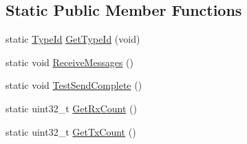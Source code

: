 \subsection*{Static Public Member Functions}
\begin{DoxyCompactItemize}
\item 
static \hyperlink{classns3_1_1TypeId}{Type\+Id} \hyperlink{classns3_1_1GrantedTimeWindowMpiInterface_a40efec8b7d4cc9a4849866ce100b141b}{Get\+Type\+Id} (void)
\item 
static void \hyperlink{classns3_1_1GrantedTimeWindowMpiInterface_a25a6699dcab1ab2e348e0b5a2c90aa42}{Receive\+Messages} ()
\item 
static void \hyperlink{classns3_1_1GrantedTimeWindowMpiInterface_a517789eabe6a386e850cffb7e4d1a0dc}{Test\+Send\+Complete} ()
\item 
static uint32\+\_\+t \hyperlink{classns3_1_1GrantedTimeWindowMpiInterface_a3b4a3753c629cabf580da859d9e23c22}{Get\+Rx\+Count} ()
\item 
static uint32\+\_\+t \hyperlink{classns3_1_1GrantedTimeWindowMpiInterface_a672feee70ece2b9a40dc60bc796e1c18}{Get\+Tx\+Count} ()
\end{DoxyCompactItemize}
